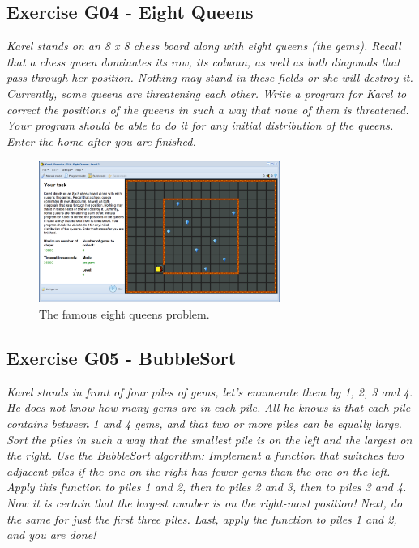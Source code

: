 \documentclass[article,A4,12pt]{llncs}
\begin{document}
\subsection{Exercise G04 - Eight Queens}

{\em Karel stands on an 8 x 8 chess board along with eight queens (the gems). Recall that a chess queen dominates its row, its column, as well as both diagonals that pass through her position. Nothing may stand in these fields or she will destroy it. Currently, some queens are threatening each other. Write a program for Karel to correct the positions of the queens in such a way that none of them is threatened. Your program should be able to do it for any initial distribution of the queens. Enter the home after you are finished.}

\begin{figure}[!ht]
\begin{center}
\includegraphics[width=0.7\textwidth]{img/g14.png}
\end{center}
\vspace{-4mm}
\caption{The famous eight queens problem.}
\label{fig:g14}
\vspace{-4mm}
\end{figure}
\noindent

\subsection{Exercise G05 - BubbleSort}

{\em Karel stands in front of four piles of gems, let's enumerate them by 1, 2, 3 and 4. He does not know how many gems are in each pile. All he knows is that each pile contains between 1 and 4 gems, and that two or more piles can be equally large. Sort the piles in such a way that the smallest pile is on the left and the largest on the right. Use the BubbleSort algorithm: Implement a function that switches two adjacent piles if the one on the right has fewer gems than the one on the left. Apply this function to piles 1 and 2, then to piles 2 and 3, then to piles 3 and 4. Now it is certain that the largest number is on the right-most position! Next, do the same for just the first three piles. Last, apply the function to piles 1 and 2, and you are done! }
\end{document}
